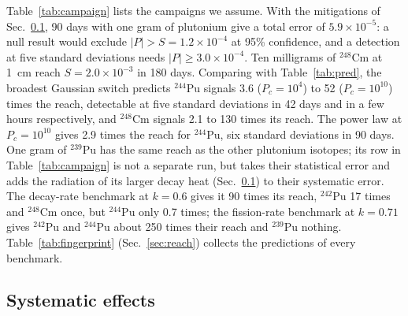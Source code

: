 \documentclass[aps,prd,onecolumn,superscriptaddress,floatfix,nofootinbib]{revtex4-2}
\newcommand{\Pu}[1]{$^{#1}$Pu}
\newcommand{\nuc}[2]{$^{#1}$#2}
\begin{document}
Table~\ref{tab:campaign} lists the campaigns we assume. With the mitigations of Sec.~\ref{sec:sys}, 90 days with
one gram of plutonium give a total error of $5.9\times10^{-5}$: a null result would exclude $|P|>S=1.2\times10^{-4}$
at 95\% confidence, and a detection at five standard deviations needs $|P|\ge3.0\times10^{-4}$. Ten milligrams of
\nuc{248}{Cm} at 1~cm reach $S=2.0\times10^{-3}$ in 180 days. Comparing with Table~\ref{tab:pred}, the broadest
Gaussian switch predicts \Pu{244} signals 3.6 ($P_c=10^{4}$) to 52 ($P_c=10^{10}$) times the reach, detectable at
five standard deviations in 42 days and in a few hours respectively, and \nuc{248}{Cm} signals 2.1 to 130 times its
reach. The power law at $P_c=10^{10}$ gives 2.9 times the reach for \Pu{244}, six standard deviations in 90 days.
One gram of \Pu{239} has the same reach as the other plutonium isotopes; its row in Table~\ref{tab:campaign} is not a
separate run, but takes their statistical error and adds the radiation of its larger decay heat (Sec.~\ref{sec:sys})
to their systematic error. The decay-rate benchmark at $k=0.6$ gives it
90 times its reach, \Pu{242} 17 times and \nuc{248}{Cm} once, but \Pu{244} only 0.7 times; the fission-rate benchmark
at $k=0.71$ gives \Pu{242} and \Pu{244} about 250 times their reach and \Pu{239} nothing. Table~\ref{tab:fingerprint}
(Sec.~\ref{sec:reach}) collects the predictions of every benchmark.



\subsection{Systematic effects}\label{sec:sys}
\end{document}
